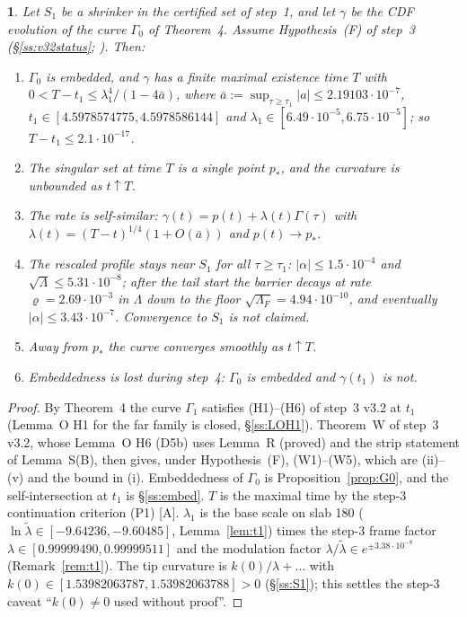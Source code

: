 \documentclass[11pt]{article}
\newtheorem*{namedthm*}{\thisthmname}
\newcommand{\thisthmname}{}
\newenvironment{named}[1]{\renewcommand{\thisthmname}{#1}\begin{namedthm*}}{\end{namedthm*}}
\theoremstyle{definition}
\theoremstyle{remark}
\newcommand{\fn}[1]{\texttt{\detokenize{#1}}}
\newcommand{\tA}{\textnormal{\textsc{[A]}}}
\newcommand{\abs}[1]{\lvert #1\rvert}
\newcommand{\Lam}{\Lambda}
\begin{document}
\begin{named}{Main Theorem (conditional on Hypothesis~(F))}
Let $S_1$ be a shrinker in the certified set of step~1, and let $\gamma$ be the CDF evolution of the curve $\Gamma_0$ of Theorem~4. Assume Hypothesis~(F) of step~3 (\S\ref{ss:v32status}; \fn{writeup/main/main.pdf}). Then:
\begin{enumerate}[label=(\roman*)]
\item $\Gamma_0$ is embedded, and $\gamma$ has a finite maximal existence time $T$ with $0<T-t_1\le\lambda_1^4/(1-4\bar a)$, where $\bar a:=\sup_{\tau\ge\tau_1}\abs a\le2.19103\cdot10^{-7}$, $t_1\in[4.5978574775,4.5978586144]$ and $\lambda_1\in[6.49\cdot10^{-5},6.75\cdot10^{-5}]$; so $T-t_1\le2.1\cdot10^{-17}$.
\item The singular set at time $T$ is a single point $p_*$, and the curvature is unbounded as $t\uparrow T$.
\item The rate is self-similar: $\gamma(t)=p(t)+\lambda(t)\Gamma(\tau)$ with $\lambda(t)=(T-t)^{1/4}(1+O(\bar a))$ and $p(t)\to p_*$.
\item The rescaled profile stays near $S_1$ for all $\tau\ge\tau_1$: $\abs\alpha\le1.5\cdot10^{-4}$ and $\sqrt\Lam\le5.31\cdot10^{-8}$; after the tail start the barrier decays at rate $\varrho=2.69\cdot10^{-3}$ in $\Lam$ down to the floor $\sqrt{\Lam_F}=4.94\cdot10^{-10}$, and eventually $\abs\alpha\le3.43\cdot10^{-7}$. Convergence to $S_1$ is not claimed.
\item Away from $p_*$ the curve converges smoothly as $t\uparrow T$.
\item Embeddedness is lost during step~4: $\Gamma_0$ is embedded and $\gamma(t_1)$ is not.
\end{enumerate}
\end{named}
\begin{proof}
By Theorem~4 the curve $\Gamma_1$ satisfies (H1)--(H6) of step~3 v3.2 at $t_1$ (Lemma~O H1 for the far family is closed, \S\ref{ss:LOH1}). Theorem~W of step~3 v3.2, whose Lemma~O H6 (D5b) uses Lemma~R (proved) and the strip statement of Lemma~S(B), then gives, under Hypothesis~(F), (W1)--(W5), which are (ii)--(v) and the bound in (i). Embeddedness of $\Gamma_0$ is Proposition~\ref{prop:G0}, and the self-intersection at $t_1$ is \S\ref{ss:embed}. $T$ is the maximal time by the step-3 continuation criterion (P1) \tA. $\lambda_1$ is the base scale on slab 180 ($\ln\tilde\lambda\in[-9.64236,-9.60485]$, Lemma~\ref{lem:t1}) times the step-3 frame factor $\lambda\in[0.99999490,0.99999511]$ and the modulation factor $\lambda/\tilde\lambda\in e^{\pm3.38\cdot10^{-8}}$ (Remark~\ref{rem:t1}). The tip curvature is $k(0)/\lambda+\dots$ with $k(0)\in[1.53982063787,1.53982063788]>0$ (\S\ref{ss:S1}); this settles the step-3 caveat ``$k(0)\neq0$ used without proof''.
\end{proof}
\end{document}

